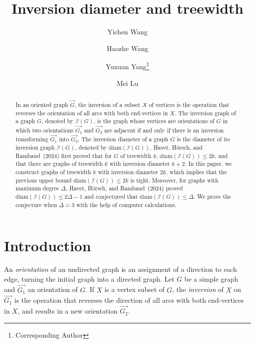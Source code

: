 \documentclass[
final
]{dmtcs-episciences}
\author[Yichen Wang et al.]{Yichen Wang\affiliationmark{1}
  \and Haozhe Wang\affiliationmark{1}
  \and Yuxuan Yang\affiliationmark{2}\thanks{Corresponding Author}
  \and Mei Lu\affiliationmark{1}}
\title{Inversion diameter and treewidth}
\affiliation{
  Department of Mathematical Sciences, Tsinghua University, Beijing, China\\
  School of Mathematical Sciences, Beijing University of Posts and Telecommunications, Beijing, China}
\begin{document}

\maketitle
\begin{abstract}
  In an oriented graph $\overrightarrow{G}$, the inversion of a subset $X$ of vertices is the operation that reverses the orientation of all arcs with both end-vertices in $X$. The inversion graph of a graph $G$, denoted by $\mathcal{I}(G)$, is the graph whose vertices are orientations of $G$ in which two orientations $\overrightarrow{G_1}$ and $\overrightarrow{G_2}$ are adjacent if and only if there is an inversion transforming $\overrightarrow{G_1}$ into $\overrightarrow{G_2}$.
The inversion diameter of a graph $G$ is the diameter of its inversion graph $\mathcal{I}(G)$, denoted by $\mathrm{diam}(\mathcal{I}(G))$.
Havet, H\"orsch, and Rambaud~(2024) first proved that for $G$ of treewidth $k$, $\mathrm{diam}(\mathcal{I}(G)) \le 2k$, and that there are graphs of treewidth $k$ with inversion diameter $k+2$.
In this paper, we construct graphs of treewidth $k$ with inversion diameter $2k$, which implies that the previous upper bound $\mathrm{diam}(\mathcal{I}(G)) \le 2k$ is tight.
Moreover, for graphs with maximum degree $\Delta$, Havet, H\"orsch, and Rambaud~(2024) proved $\mathrm{diam}(\mathcal{I}(G)) \le 2\Delta-1$ and conjectured that $\mathrm{diam}(\mathcal{I}(G)) \le \Delta$. We prove the conjecture when $\Delta=3$ with the help of computer calculations.
\end{abstract}


\section{Introduction}
An \emph{orientation} of an undirected graph is an assignment of a direction to each edge, turning the initial graph into a directed graph. Let $G$ be a simple graph and $\overrightarrow{G_1}$ an orientation of $G$. If $X$ is a vertex subset of $G$, the \emph{inversion} of $X$ on $\overrightarrow{G_1}$ is the operation that reverses the direction of all arcs with both end-vertices in $X$, and results in a new
orientation $\overrightarrow{G_2}$.
\end{document}
